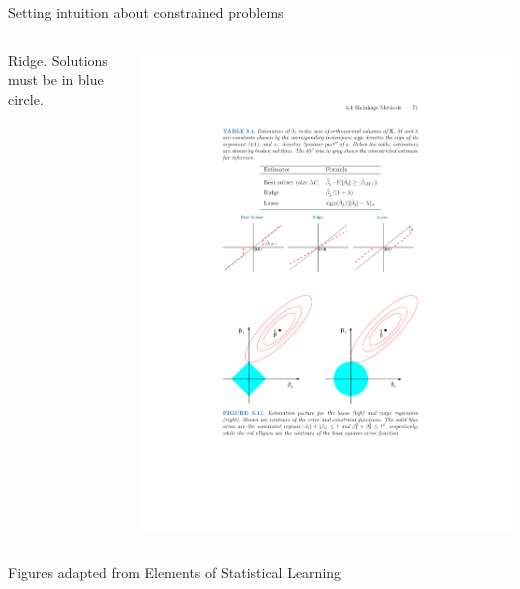 \documentclass[mathserif, aspectratio=169]{beamer}
\begin{document}
\begin{frame}{Setting intuition about constrained problems}
\begin{columns}
\pause
{}
\begin{center}
Ridge.  Solutions must be in blue circle.
\end{center}
\includegraphics[scale=0.65]{RSE_ridge_constr}

\end{columns}

{\tiny Figures adapted from Elements of Statistical Learning}

\end{frame}
\end{document}
